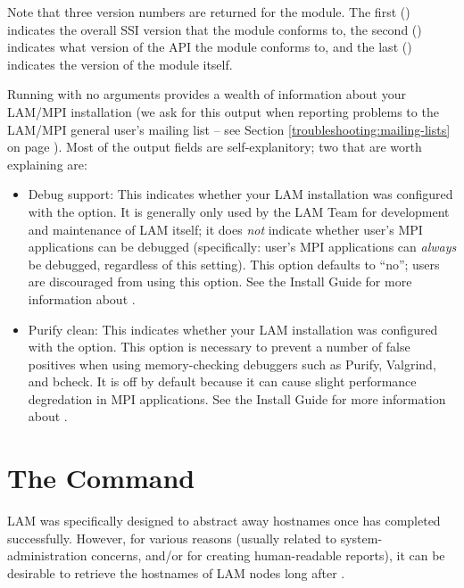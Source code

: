 Note that three version numbers are returned for the  module.
The first () indicates the overall SSI version that the
module conforms to, the second () indicates what version
of the  API the module conforms to, and the last
() indicates the version of the module itself.

Running  with no arguments provides a wealth of
information about your LAM/MPI installation (we ask for this output
when reporting problems to the LAM/MPI general user's mailing list --
see Section \ref{troubleshooting:mailing-lists} on page
\pageref{troubleshooting:mailing-lists}).  Most of the output fields
are self-explanitory; two that are worth explaining are:

\begin{itemize}
\item Debug support: This indicates whether your LAM installation was
  configured with the  option.  It is generally
  only used by the LAM Team for development and maintenance of LAM
  itself; it does {\em not} indicate whether user's MPI applications
  can be debugged (specifically: user's MPI applications can {\em
    always} be debugged, regardless of this setting).  This option
  defaults to ``no''; users are discouraged from using this option.
  See the Install Guide for more information about
  .
  
\item Purify clean: This indicates whether your LAM installation was
  configured with the  option.  This option is
  necessary to prevent a number of false positives when using
  memory-checking debuggers such as Purify, Valgrind, and bcheck.  It
  is off by default because it can cause slight performance
  degredation in MPI applications.  See the Install Guide for more
  information about .
\end{itemize}


\section{The  Command}
\label{sec:commands-lamnodes}

LAM was specifically designed to abstract away hostnames once
 has completed successfully.  However, for various
reasons (usually related to system-administration concerns, and/or for
creating human-readable reports), it can be desirable to retrieve the
hostnames of LAM nodes long after .

